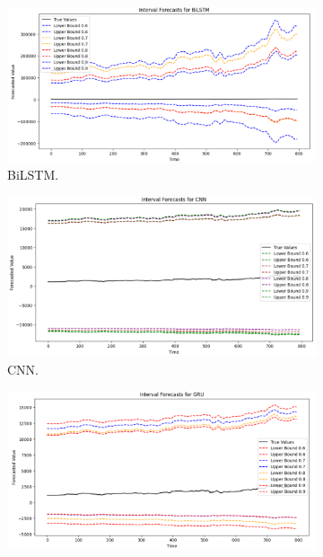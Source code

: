 \begin{figure}[H]
    \centering
        \begin{minipage}{0.6\textwidth}
            \centering
            \begin{subfigure}[b]{1.0\textwidth}
                \centering
                \includegraphics[width=\textwidth]{Chap02/figs/LUBE_BiLSTM_AsianPaints.png}
                \caption{BiLSTM.}
            \end{subfigure}
            \hfill
            \begin{subfigure}[b]{1.0\textwidth}
                \centering
                \includegraphics[width=\textwidth]{Chap02/figs/LUBE_CNN_AsianPaints.png}
                \caption{CNN.}
            \end{subfigure}
            \begin{subfigure}[b]{1.0\textwidth}
                \centering
                \includegraphics[width=\textwidth]{Chap02/figs/LUBE_GRU_AsianPaints.png}

\end{subfigure}
\end{minipage}
\end{figure}
